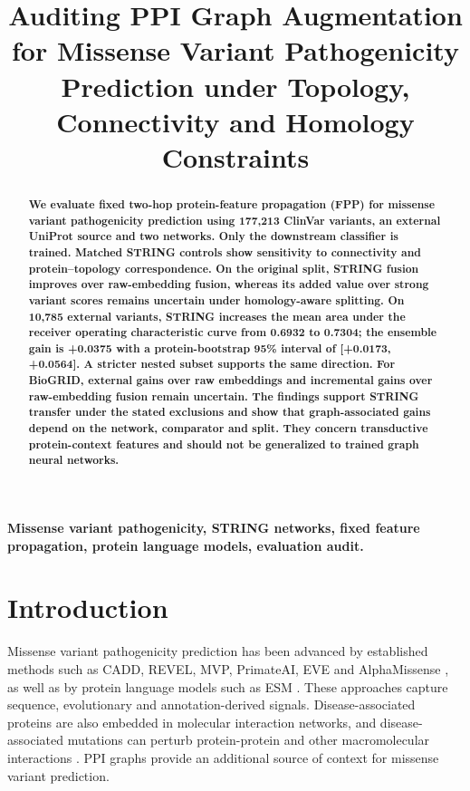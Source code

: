 \documentclass[conference]{IEEEtran}
\title{Auditing PPI Graph Augmentation for Missense Variant Pathogenicity Prediction under Topology, Connectivity and Homology Constraints}
\author{}
\begin{document}
\maketitle


\begin{abstract}
\bfseries\boldmath
We evaluate fixed two-hop protein-feature propagation (FPP) for missense variant pathogenicity prediction using 177,213 ClinVar variants, an external UniProt source and two networks. Only the downstream classifier is trained. Matched STRING controls show sensitivity to connectivity and protein--topology correspondence. On the original split, STRING fusion improves over raw-embedding fusion, whereas its added value over strong variant scores remains uncertain under homology-aware splitting. On 10,785 external variants, STRING increases the mean area under the receiver operating characteristic curve from 0.6932 to 0.7304; the ensemble gain is +0.0375 with a protein-bootstrap 95\% interval of [+0.0173, +0.0564]. A stricter nested subset supports the same direction. For BioGRID, external gains over raw embeddings and incremental gains over raw-embedding fusion remain uncertain. The findings support STRING transfer under the stated exclusions and show that graph-associated gains depend on the network, comparator and split. They concern transductive protein-context features and should not be generalized to trained graph neural networks.

\end{abstract}

\begin{IEEEkeywords}
\bfseries\boldmath
Missense variant pathogenicity, STRING networks, fixed feature propagation, protein language models, evaluation audit.
\end{IEEEkeywords}

\section{Introduction}

Missense variant pathogenicity prediction has been advanced by established methods such as CADD, REVEL, MVP, PrimateAI, EVE and AlphaMissense \cite{Kircher2014CADD,Ioannidis2016REVEL,Qi2021MVP,Sundaram2018PrimateAI,Frazer2021EVE,Cheng2023AlphaMissense}, as well as by protein language models such as ESM \cite{Lin2023ESM}. These approaches capture sequence, evolutionary and annotation-derived signals. Disease-associated proteins are also embedded in molecular interaction networks, and disease-associated mutations can perturb protein-protein and other macromolecular interactions \cite{Barabasi2011NetworkMedicine,Menche2015DiseaseModules,Sahni2015InteractionPerturbation,Chen2018InteractomePerturbation}. PPI graphs provide an additional source of context for missense variant prediction.
\end{document}
